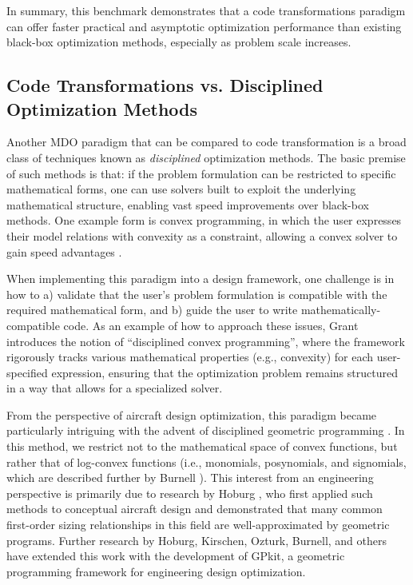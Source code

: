 In summary, this benchmark demonstrates that a code transformations paradigm can offer faster practical and asymptotic optimization performance than existing black-box optimization methods, especially as problem scale increases.

\subsection{Code Transformations vs. Disciplined Optimization Methods}
\label{sec:benchmark_gpkit}

Another MDO paradigm that can be compared to code transformation is a broad class of techniques known as \emph{disciplined} optimization methods. The basic premise of such methods is that: if the problem formulation can be restricted to specific mathematical forms, one can use solvers built to exploit the underlying mathematical structure, enabling vast speed improvements over black-box methods. One example form is convex programming, in which the user expresses their model relations with convexity as a constraint, allowing a convex solver to gain speed advantages \cite{boyd_convex_2004}.

When implementing this paradigm into a design framework, one challenge is in how to a) validate that the user's problem formulation is compatible with the required mathematical form, and b) guide the user to write mathematically-compatible code. As an example of how to approach these issues, Grant \cite{grant_disciplined_2006} introduces the notion of ``disciplined convex programming'', where the framework rigorously tracks various mathematical properties (e.g., convexity) for each user-specified expression, ensuring that the optimization problem remains structured in a way that allows for a specialized solver.

From the perspective of aircraft design optimization, this paradigm became particularly intriguing with the advent of disciplined geometric programming \cite{boyd_tutorial_2007, agrawal_disciplined_2019}. In this method, we restrict not to the mathematical space of convex functions, but rather that of log-convex functions (i.e., monomials, posynomials, and signomials, which are described further by Burnell \cite{gpkit}). This interest from an engineering perspective is primarily due to research by Hoburg \cite{hoburg_geometric_2014}, who first applied such methods to conceptual aircraft design and demonstrated that many common first-order sizing relationships in this field are well-approximated by geometric programs. Further research by Hoburg, Kirschen, Ozturk, Burnell, and others \cite{kirschen, ozturk_conceptual_2018, jho} have extended this work with the development of GPkit, a geometric programming framework for engineering design optimization.


